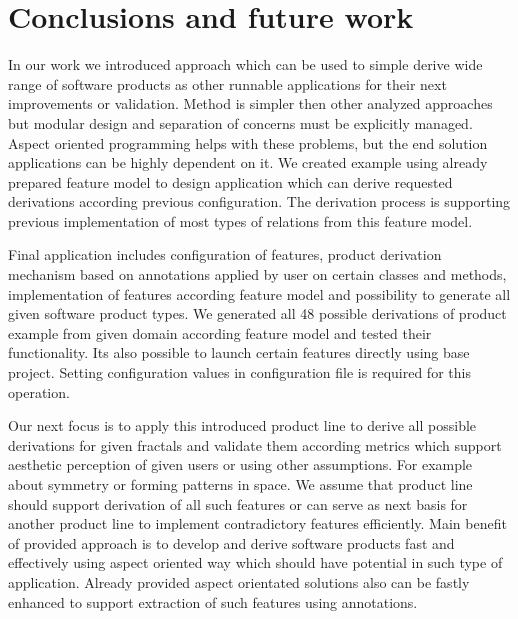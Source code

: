 \documentclass[11pt,english,a4paper,twoside]{article}
\begin{document}
\section{Conclusions and future work} \label{conclusions}

In our work we introduced approach which can be used to simple derive wide range of software products as other runnable applications for their next improvements or validation. Method is simpler then other analyzed approaches but modular design and separation of concerns must be explicitly managed. Aspect oriented programming helps with these problems, but the end solution applications can be highly dependent on it. We created example using already prepared feature model to design application which can derive requested derivations according previous configuration. The derivation process is supporting previous implementation of most types of relations from this feature model. 

Final application includes configuration of features, product derivation mechanism based on annotations applied by user on certain classes and methods, implementation of features according feature model and possibility to generate all given software product types.  We generated all 48 possible derivations of product example from given domain according feature model and tested their functionality. Its also possible to launch certain features directly using base project. Setting configuration values in configuration file is required for this operation.

Our next focus is to apply this introduced product line to derive all possible derivations for given fractals and validate them according metrics which support aesthetic perception of given users or using other assumptions. For example about symmetry or forming patterns in space. We assume that product line should support derivation of all such features or can serve as next basis for another product line to implement contradictory features efficiently. Main benefit of provided approach is to develop and derive software products fast and effectively using aspect oriented way which should have potential in such type of application. Already provided aspect orientated solutions also can be fastly enhanced to support extraction of such features using annotations.
 


\end{document}
